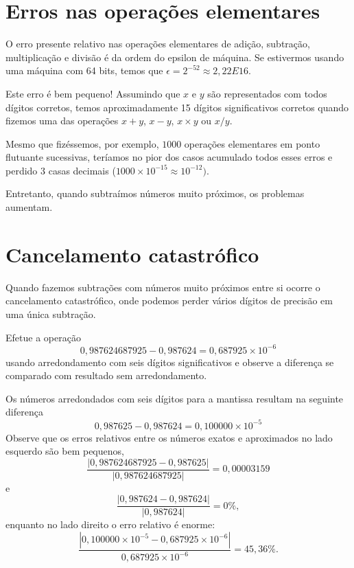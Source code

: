 \fi

\section{Erros nas operações elementares}
O erro presente relativo nas operações elementares de adição, subtração, multiplicação e divisão é da ordem do epsilon de máquina. Se estivermos usando uma máquina com 64 bits, temos que $\epsilon = 2^{-52} \approx 2,22E16$. 

Este erro é bem pequeno! Assumindo que $x$ e $y$ são representados com todos dígitos corretos, temos aproximadamente 15 dígitos significativos corretos quando fizemos uma das operações $x+y$, $x-y$, $x\times y$ ou $x/y$. 


Mesmo que fizéssemos, por exemplo, $1000$ operações elementares em ponto flutuante sucessivas, teríamos no pior dos casos acumulado todos esses erros e perdido $3$ casas decimais ($1000\times 10^{-15} \approx 10^{-12})$.

Entretanto, quando subtraímos números muito próximos, os problemas aumentam.

\section{Cancelamento catastrófico}

Quando fazemos subtrações com números muito próximos entre si ocorre o cancelamento catastrófico, onde podemos perder vários dígitos de precisão em uma única subtração.

\begin{ex}Efetue a operação
  \begin{equation*}
    0,987624687925-0,987624=0,687925\times 10^{-6}    
  \end{equation*}
usando arredondamento com seis dígitos significativos e observe a diferença se comparado com resultado sem arredondamento.
\end{ex}
\begin{sol}
Os números arredondados com seis dígitos para a mantissa resultam na seguinte diferença
$$
0,987625-0,987624=0,100000\times 10^{-5}
$$
Observe que os erros relativos entre os números exatos e aproximados no lado esquerdo são bem pequenos,
\begin{equation*}
  \frac{|0,987624687925-0,987625|}{|0,987624687925|}=0,00003159  
\end{equation*}
e
\begin{equation*}
  \frac{|0,987624-0,987624|}{|0,987624|}=0\%,
\end{equation*}
enquanto no lado direito o erro relativo é enorme:
\begin{equation*}
\frac{|0,100000\times 10^{-5}-0,687925\times 10^{-6}|}{0,687925\times 10^{-6}}=45,36\%.  
\end{equation*}
\end{sol}

